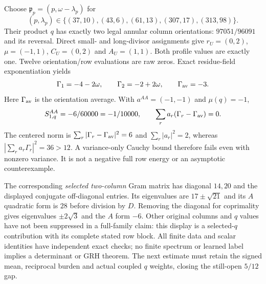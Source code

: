 Choose $\mathfrak p_p=(p,\omega-\lambda_p)$ for
\[
 (p,\lambda_p)\in\{(37,10),(43,6),(61,13),(307,17),(313,98)\}.
\]
Their product $q$ has exactly two legal annular column orientations:
$97051/96091$ and its reversal. Direct small- and long-divisor assignments
give $r_U=(0,2)$, $\mu=(-1,1)$, $C_U=(0,2)$ and $A_U=(1,1)$.
Both profile values are exactly one. Twelve orientation/row evaluations
are raw zeros. Exact residue-field exponentiation yields
\[
 \Gamma_1=-4-2\omega,\qquad \Gamma_2=-2+2\omega,
 \qquad \Gamma_{\rm av}=-3.
\]
Here $\Gamma_{\rm av}$ is the orientation average.
With $a^{AA}=(-1,-1)$ and $\mu(q)=-1$,
\[
 S_{1,q}^{AA}=-6/60000=-1/10000,\qquad
 \sum_r a_r(\Gamma_r-\Gamma_{\rm av})=0.
\]
The centered norm is
$\sum_r|\Gamma_r-\Gamma_{\rm av}|^2=6$ and $\sum_r|a_r|^2=2$,
whereas $|\sum_ra_r\Gamma_r|^2=36>12$.
A variance-only Cauchy bound therefore fails even with nonzero variance.
It is not a negative full row energy or an asymptotic counterexample.

The corresponding \emph{selected two-column} Gram matrix has diagonal
$14,20$ and the displayed conjugate off-diagonal entries. Its eigenvalues
are $17\pm\sqrt{21}$ and its $A$ quadratic form is $28$ before division
by $D$. Removing the diagonal for coprimality gives eigenvalues
$\pm2\sqrt3$ and the $A$ form $-6$. Other original columns and $q$ values
have not been suppressed in a full-family claim: this display is a
selected-$q$ contribution with its complete stated row block.
All finite data and scalar identities have independent exact checks;
no finite spectrum or learned label implies a determinant or GRH theorem.
The next estimate must retain the signed mean, reciprocal burden and
actual coupled $q$ weights, closing the still-open $5/12$ gap.
